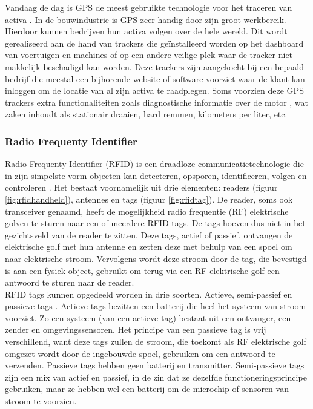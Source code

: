 Vandaag de dag is GPS de meest gebruikte technologie voor het traceren van activa \autocite{Nasr2013}. In de bouwindustrie is GPS zeer handig door zijn groot werkbereik. Hierdoor kunnen bedrijven hun activa volgen over de hele wereld. Dit wordt gerealiseerd aan de hand van trackers die geïnstalleerd worden op het dashboard van voertuigen en machines of op een andere veilige plek waar de tracker niet makkelijk beschadigd kan worden. Deze trackers zijn aangekocht bij een bepaald bedrijf die meestal een bijhorende website of software voorziet waar de klant kan inloggen om de locatie van al zijn activa te raadplegen. Soms voorzien deze GPS trackers extra functionaliteiten zoals diagnostische informatie over de motor \autocite{Devlin2009}, wat zaken inhoudt als stationair draaien, hard remmen, kilometers per liter, etc.

\subsubsection{Radio Frequenty Identifier}

Radio Frequenty Identifier (RFID) is een draadloze communicatietechnologie die in zijn simpelste vorm objecten kan detecteren, opsporen, identificeren, volgen en controleren \autocite{Tan2022}. Het bestaat voornamelijk uit drie elementen: readers (figuur \ref{fig:rfidhandheld}), antennes en tags (figuur \ref{fig:rfidtag}). De reader, soms ook transceiver genaamd, heeft de mogelijkheid radio frequentie (RF) elektrische golven te sturen naar een of meerdere RFID tags. De tags hoeven dus niet in het gezichtsveld van de reader te zitten. Deze tags, actief of passief, ontvangen de elektrische golf met hun antenne en zetten deze met behulp van een spoel om naar elektrische stroom. Vervolgens wordt deze stroom door de tag, die bevestigd is aan een fysiek object, gebruikt om terug via een RF elektrische golf een antwoord te sturen naar de reader.\\

RFID tags kunnen opgedeeld worden in drie soorten. Actieve, semi-passief en passieve tags \autocite{Mezzanotte2021}.  Actieve tags bezitten een batterij die heel het systeem van stroom voorziet. Zo een systeem (van een actieve tag) bestaat uit een ontvanger, een zender en omgevingssensoren. Het principe van een passieve tag is vrij verschillend, want deze tags zullen de stroom, die toekomt als RF elektrische golf omgezet wordt door de ingebouwde spoel, gebruiken om een antwoord te verzenden. Passieve tags hebben geen batterij en transmitter. Semi-passieve tags zijn een mix van actief en passief, in de zin dat ze dezelfde functioneringsprincipe gebruiken, maar ze hebben wel een batterij om de microchip of sensoren van stroom te voorzien.\\

